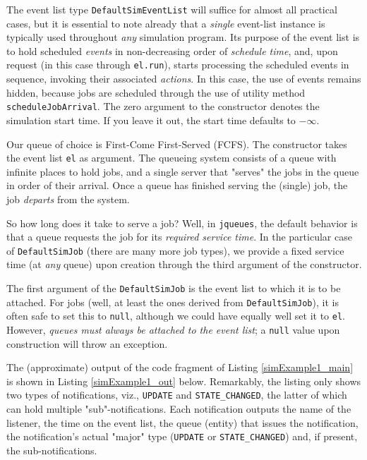 The event list type
  \lstinline|DefaultSimEventList|
  will suffice for almost all practical cases,
  but it is essential to note already that
  a {\em single\/} event-list instance is typically used
  throughout {\em any\/} simulation program.
Its purpose of the event list is to hold scheduled {\em events\/}
  in non-decreasing order of {\em schedule time},
  and, upon request (in this case through \lstinline|el.run|),
  starts processing the scheduled events in sequence,
  invoking their associated {\em actions}.
In this case,
  the use of events remains hidden,
  because jobs are scheduled through the use of utility method
  \lstinline|scheduleJobArrival|.
The zero argument to the constructor denotes
  the simulation start time.
If you leave it out, the start time defaults to $-\infty$.

Our queue of choice is First-Come First-Served (FCFS).
The constructor takes the event list \lstinline|el|
  as argument.
The queueing system consists of a queue with infinite
  places to hold jobs,
  and a single server that "serves" the jobs in the queue in order
  of their arrival.
Once a queue has finished serving the (single) job,
  the job {\em departs\/} from the system.

So how long does it take to serve a job?
Well, in \lstinline|jqueues|,
  the default behavior is that
  a queue requests the job for its
  {\em required service time}.
In the particular case of \lstinline|DefaultSimJob|
  (there are many more job types),
  we provide a fixed service time (at {\em any\/} queue)
  upon creation through the third argument of the constructor.
  
The first argument of the \lstinline-DefaultSimJob-
  is the event list to which it is to be attached.
For jobs (well, at least the ones derived from \lstinline|DefaultSimJob|),
  it is often safe to set this to \lstinline|null|,
  although we could have equally well set it to \lstinline|el|.
However, {\em queues must always be attached to the event list\/};
  a \lstinline|null| value upon construction will throw an exception.

The (approximate) output of the code fragment
  of Listing \ref{simExample1_main}
  is shown in Listing \ref{simExample1_out} below.
Remarkably,
  the listing only shows two types of notifications,
  viz.,
  \lstinline|UPDATE|
  and
  \lstinline|STATE_CHANGED|,
  the latter of which can hold
  multiple "sub"-notifications.
Each notification outputs
  the name of the listener,
  the time on the event list,
  the queue (entity) that issues the notification,
  the notification's actual "major" type
  (\lstinline|UPDATE| or \lstinline|STATE_CHANGED|)
  and, if present,
  the sub-notifications.

